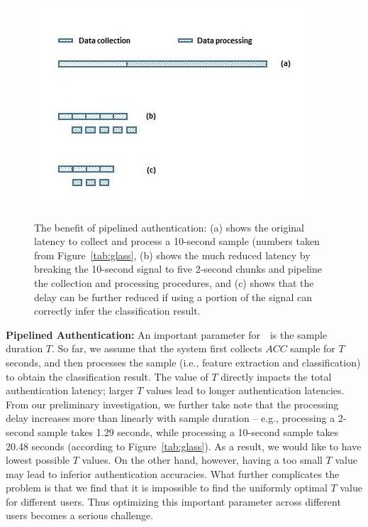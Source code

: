 \begin{figure}\centering
\includegraphics[width=0.75\linewidth]{../figure/pipeline.jpg} \\
\caption{\label{fig:pipeline} The benefit of pipelined authentication: (a) shows the original latency to collect and process a 10-second sample (numbers taken from Figure~\ref{tab:glass}, (b) shows the much reduced latency by breaking the 10-second signal to five 2-second chunks and pipeline the collection and processing procedures, and (c) shows that the delay can be further reduced if using a portion of the signal can correctly infer the classification result.}
\vspace{-6pt}
\end{figure}
\vspace{4pt}\textbf{Pipelined Authentication:} An important parameter for~\systemname~is the sample duration $T$. So far, we assume that the system first collects $ACC$ sample for $T$ seconds, and then processes the sample (i.e., feature extraction and classification) to obtain the classification result. The value of $T$ directly impacts the total authentication latency; larger $T$ values lead to longer authentication latencies.  From our preliminary investigation, we further take note that the processing delay increases more than linearly with sample duration -- e.g., processing a 2-second sample takes 1.29 seconds, while processing a 10-second sample takes 20.48 seconds (according to Figure~\ref{tab:glass}). As a result, we would like to have lowest possible $T$ values. On the other hand, however, having a too small $T$ value may lead to inferior authentication accuracies. What further complicates the problem is that we find that it is impossible to find the uniformly optimal $T$ value for different users. Thus optimizing this important parameter across different users becomes a serious challenge.

